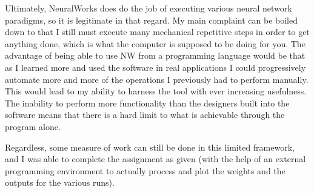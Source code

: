 \documentclass[12pt]{article}
\begin{document}
Ultimately, NeuralWorks does do the job of executing various neural network paradigms, so it is legitimate in that regard.  My main complaint can be boiled down to that I still must execute many mechanical repetitive steps in order to get anything done, which is what the computer is supposed to be doing for you.  The advantage of being able to use NW from a programming language would be that as I learned more and used the software in real applications I could progressively automate more and more of the operations I previously had to perform manually.  This would lead to my ability to harness the tool with ever increasing usefulness.  The inability to perform more functionality than the designers built into the software means that there is a hard limit to what is achievable through the program alone.  

Regardless, some measure of work can still be done in this limited framework, and I was able to complete the assignment as given (with the help of an external programming environment to actually process and plot the weights and the outputs for the various runs).  
\end{document}
